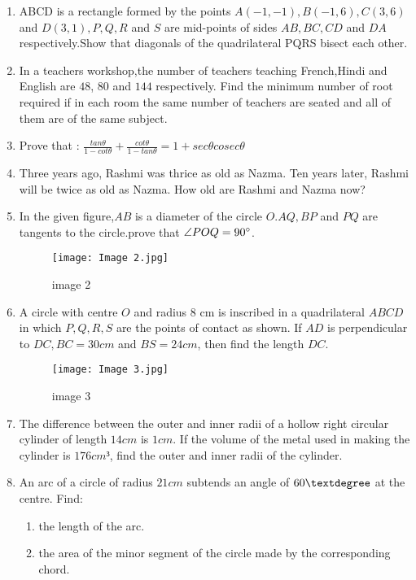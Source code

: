 \documentclass{article}
\begin{document}
\begin{enumerate}
\item ABCD is a rectangle formed by the points $ A (-1,-1), B (-1, 6), C (3, 6)$ and $D (3, 1), P, Q, R$ and $S$ are mid-points of sides $AB, BC, CD$ and $DA$ respectively.Show that diagonals of the quadrilateral PQRS bisect each other.
\item\text{} In a teachers workshop,the number of teachers teaching French,Hindi and English are $48$, $80$ and $144$ respectively. Find the minimum number of root required if in each room the same number of teachers are seated and all of them are of the same subject.
\item Prove that : $\frac{tan{\theta}}{1-cot{\theta}} + \frac{cot{\theta}}{1-tan{\theta}} = 1 + sec\theta cosec\theta$
\item Three years ago, Rashmi was thrice as old as Nazma. Ten years later, Rashmi will be twice as old as Nazma. How old are Rashmi and Nazma now?
\item In the given figure,$AB$ is a diameter of the circle $O. AQ, BP$ and $PQ$ are tangents to the circle.prove that $\angle POQ = 90\degree$.
\begin{figure}[!ht]
\centering
\texttt{[image: Image 2.jpg]}
\label{fig:Image 2}
\caption{image 2}
\end{figure}
\newpage
\item  A circle with centre $O$ and radius 8 cm is inscribed in a quadrilateral $ABCD$ in which $P, Q, R, S$ are the points of contact as shown. If $AD$ is perpendicular to $DC, BC = 30 cm$ and $BS = 24 cm$, then find the length $DC$.
\begin{figure}[!ht]
\centering
\texttt{[image: Image 3.jpg]}
\label{fig:Image 3}
\caption{image 3}
\end{figure}
\item The difference between the outer and inner radii of a hollow right circular cylinder of length $14 cm$ is $1 cm$. If the volume of the metal used in making the cylinder is $176 cm³$, find the outer and inner radii of the cylinder.
\newpage
\item An arc of a circle of radius $21 cm$ subtends an angle of $60\textdegree$ at the centre. Find:\\
\begin{enumerate}
\item\text the length of the arc.
\item \text the area of the minor segment of the circle made by the corresponding chord.
\end{enumerate}

\end{enumerate}
\end{document}
